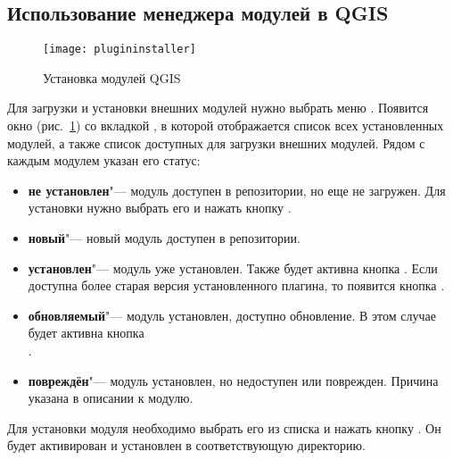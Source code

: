 \subsection{Использование менеджера модулей в QGIS}\label{sec:python_plugin_installer}

\begin{figure}[ht]
   \centering
   \texttt{[image: plugininstaller]}
   \caption{Установка модулей QGIS \wincaption}\label{fig:plugininstaller}\smallskip
\end{figure}

Для загрузки и установки внешних модулей нужно выбрать меню
 \arrow {}.
Появится окно 
(рис.~\ref{fig:plugininstaller}) со вкладкой , в которой
отображается список всех установленных модулей, а также список доступных
для загрузки внешних модулей. Рядом с каждым модулем указан его статус:
\begin{itemize}[label=--]
\item \textbf{не установлен}"--- модуль доступен в репозитории, но еще
не загружен. Для установки нужно выбрать его и нажать кнопку
.
\item \textbf{новый}"--- новый модуль доступен в репозитории.
\item \textbf{установлен}"--- модуль уже установлен. Также будет
активна кнопка . Если доступна более
старая версия установленного плагина, то появится кнопка
.
\item \textbf{обновляемый}"--- модуль установлен, доступно обновление.
В этом случае будет активна кнопка \\
.
\item \textbf{повреждён}"--- модуль установлен, но недоступен или
поврежден. Причина указана в описании к модулю.
\end{itemize}


Для установки модуля необходимо выбрать его из списка и нажать кнопку
. Он будет активирован и установлен в
соответствующую директорию.

